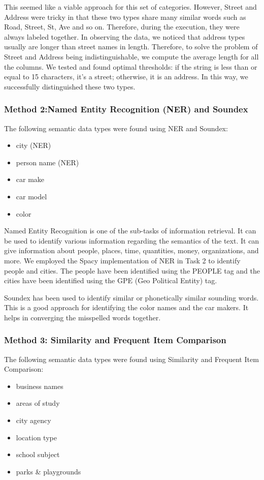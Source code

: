 \documentclass[sigconf,authordraft]{acmart}
\begin{document}
This seemed like a viable approach for this set of categories. However, Street and Address were tricky in that these two types share many similar words such as Road, Street, St, Ave and so on. Therefore, during the execution, they were always labeled together. In observing the data, we noticed that address types usually are longer than street names in length. Therefore, to solve the problem of Street and Address being indistinguishable, we compute the average length for all the columns. We tested and found optimal thresholds: if the string is less than or equal to 15 characters, it's a street; otherwise, it is an address. In this way, we successfully distinguished these two types. 

\subsubsection{Method 2:Named Entity Recognition (NER) and Soundex}
The following semantic data types were found using NER and Soundex:
\begin{itemize}
    \item city (NER)
    \item person name (NER)
    \item car make
    \item car model
    \item color
\end{itemize}

Named Entity Recognition is one of the sub-tasks of information retrieval. It can be used to identify various information regarding the semantics of the text. It can give information about people, places, time, quantities, money, organizations, and more. We employed the Spacy implementation of NER in Task 2 to identify people and cities. The people have been identified using the PEOPLE tag and the cities have been identified using the GPE (Geo Political Entity) tag.

Soundex has been used to identify similar or phonetically similar sounding words. This is a good approach for identifying the color names and the car makers. It helps in converging the misspelled words together. 

\subsubsection{Method 3: Similarity and Frequent Item Comparison}
The following semantic data types were found using Similarity and Frequent Item Comparison:
\begin{itemize}
    \item business names
    \item areas of study
    \item city agency
    \item location type
    \item school subject
    \item parks & playgrounds
\end{itemize}
\end{document}
